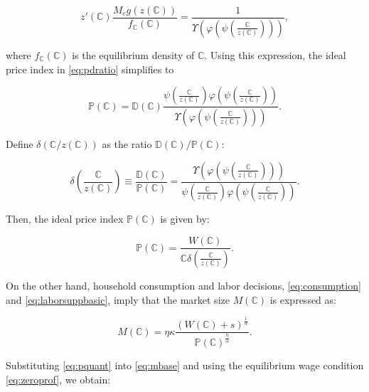 \begin{equation}\label{eq:partialsorting}
	z'({\mathbb{C}}) \frac{M_e g(z({\mathbb{C}}))}{f_{{\mathbb{C}}}({\mathbb{C}})} = \frac{1}{\Upsilon\left(\varphi \left(\psi \left(\frac{{\mathbb{C}}}{z({\mathbb{C}})}\right)\right)\right)},
\end{equation}

where $f_{{\mathbb{C}}}(\mathbb{C})$ is the equilibrium density of ${\mathbb{C}}$. Using this expression, the ideal price index in \eqref{eq:pdratio} simplifies to  

\begin{equation*}
	\mathbb{P}(\mathbb{C}) = \mathbb{D}(\mathbb{C}) \frac{\psi\left(\frac{{\mathbb{C}}}{z(\mathbb{C})}\right) \varphi\left(\psi\left(\frac{{\mathbb{C}}}{z(\mathbb{C})}\right)\right)}{\Upsilon\left(\varphi \left(\psi \left(\frac{{\mathbb{C}}}{z({\mathbb{C}})}\right)\right)\right)}.
\end{equation*}

Define $\delta(\mathbb{C}/z(\mathbb{C}))$ as the ratio $\mathbb{D}(\mathbb{C})/\mathbb{P}(\mathbb{C})$:

\begin{equation*}
	\delta\left(\frac{\mathbb{C}}{z(\mathbb{C})} \right) \equiv \frac{\mathbb{D}(\mathbb{C})}{\mathbb{P}(\mathbb{C})} = \frac{\Upsilon\left(\varphi \left(\psi \left(\frac{{\mathbb{C}}}{z({\mathbb{C}})}\right)\right)\right)}{\psi\left(\frac{{\mathbb{C}}}{z(\mathbb{C})}\right) \varphi\left(\psi\left(\frac{{\mathbb{C}}}{z(\mathbb{C})}\right)\right)}.
\end{equation*}

Then, the ideal price index $\mathbb{P}({\mathbb{C}})$ is given by:

\begin{equation}\label{eq:pquant}
	\mathbb{P}({\mathbb{C}}) = \frac{W({\mathbb{C}})}{{\mathbb{C}} \delta \left(\frac{\mathbb{C}}{z({\mathbb{C}})}\right)}.
\end{equation}

On the other hand, household consumption and labor decisions, \eqref{eq:consumption} and \eqref{eq:laborsuppbasic}, imply that the market size $M(\mathbb{C})$ is expressed as:

\begin{equation}\label{eq:mbase}
	M({\mathbb{C}}) = \eta \kappa \frac{\left(W(\mathbb{C}) + s \right)^{\frac{1}{\alpha}}}{\mathbb{P}(\mathbb{C})^{\frac{\eta}{\alpha}}}.
\end{equation}

Substituting \eqref{eq:pquant} into \eqref{eq:mbase} and using the equilibrium wage condition \eqref{eq:zeroprof}, we obtain:

